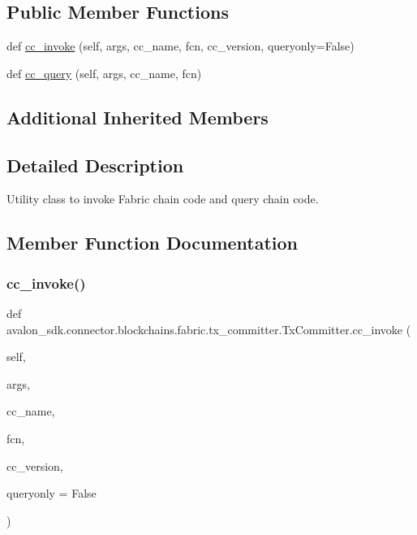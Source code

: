 \subsection*{Public Member Functions}
\begin{DoxyCompactItemize}
\item 
def \hyperlink{classavalon__sdk_1_1connector_1_1blockchains_1_1fabric_1_1tx__committer_1_1TxCommitter_ab3e1b584e4a3e7b0da792c8cd2c81fed}{cc\+\_\+invoke} (self, args, cc\+\_\+name, fcn, cc\+\_\+version, queryonly=False)
\item 
def \hyperlink{classavalon__sdk_1_1connector_1_1blockchains_1_1fabric_1_1tx__committer_1_1TxCommitter_a1e25ebd71d18d1b604d56cff3ac11c0b}{cc\+\_\+query} (self, args, cc\+\_\+name, fcn)
\end{DoxyCompactItemize}
\subsection*{Additional Inherited Members}


\subsection{Detailed Description}
\begin{DoxyVerb}Utility class to invoke Fabric chain code and query
chain code.
\end{DoxyVerb}
 

\subsection{Member Function Documentation}
\mbox{\label{classavalon__sdk_1_1connector_1_1blockchains_1_1fabric_1_1tx__committer_1_1TxCommitter_ab3e1b584e4a3e7b0da792c8cd2c81fed}} 
\subsubsection{\texorpdfstring{cc\+\_\+invoke()}{cc\_invoke()}}
{\footnotesize\ttfamily def avalon\+\_\+sdk.\+connector.\+blockchains.\+fabric.\+tx\+\_\+committer.\+Tx\+Committer.\+cc\+\_\+invoke (\begin{DoxyParamCaption}\item[{}]{self,  }\item[{}]{args,  }\item[{}]{cc\+\_\+name,  }\item[{}]{fcn,  }\item[{}]{cc\+\_\+version,  }\item[{}]{queryonly = {\ttfamily False} }\end{DoxyParamCaption})}

